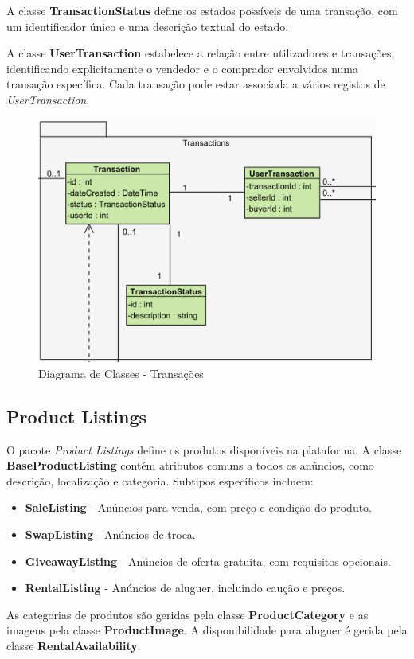 \documentclass[a4paper, 12pt]{article} %
\begin{document}
A classe \textbf{TransactionStatus} define os estados possíveis de uma transação, com um identificador único e uma descrição textual do estado.

A classe \textbf{UserTransaction} estabelece a relação entre utilizadores e transações, identificando explicitamente o vendedor e o comprador envolvidos numa transação específica. Cada transação pode estar associada a vários registos de \textit{UserTransaction}.

\begin{figure}[ht]
	\centering
	\includegraphics[width=\textwidth]{../images/class-diagram-transactions.png}
	\caption{Diagrama de Classes - Transações}
	\label{fig:class_diagram_transactions}
\end{figure}

\subsection{Product Listings}
O pacote \textit{Product Listings} define os produtos disponíveis na plataforma. A classe \textbf{BaseProductListing} contém atributos comuns a todos os anúncios, como descrição, localização e categoria. Subtipos específicos incluem:
\begin{itemize}
	\item \textbf{SaleListing} - Anúncios para venda, com preço e condição do produto.
	\item \textbf{SwapListing} - Anúncios de troca.
	\item \textbf{GiveawayListing} - Anúncios de oferta gratuita, com requisitos opcionais.
	\item \textbf{RentalListing} - Anúncios de aluguer, incluindo caução e preços.
\end{itemize}
As categorias de produtos são geridas pela classe \textbf{ProductCategory} e as imagens pela classe \textbf{ProductImage}. A disponibilidade para aluguer é gerida pela classe \textbf{RentalAvailability}.
\end{document}
